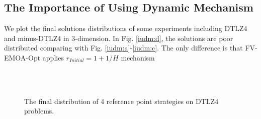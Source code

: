 \documentclass[conference]{IEEEtran}
\begin{document}
% 
\subsection{The Importance of Using Dynamic Mechanism}
We plot the final solutions distributions of some experiments including DTLZ4 and minus-DTLZ4 in 3-dimension.
In Fig. \ref{iudm:d}, the solutions are poor distributed comparing with Fig. \ref{iudm:a}-\ref{iudm:c}. 
The only difference is that FV-EMOA-Opt applies $r_{Initial} = 1+1/H$ mechanism
\begin{figure}[!t]
  \centering
  \quad
  \\
  \quad
  \\
  \caption{
    The final distribution of 4 reference point strategies on DTLZ4 problems.
  }
  \label{iudm}
\end{figure}
\end{document}

